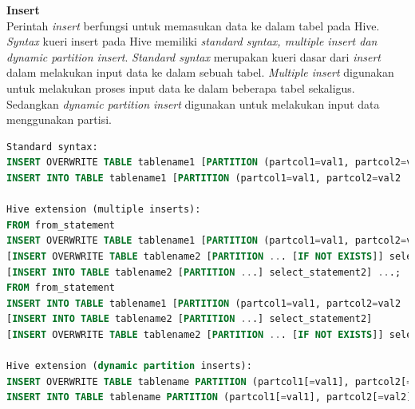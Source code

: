 \textbf{Insert}\\
Perintah \textit{insert} berfungsi untuk memasukan data ke dalam tabel pada Hive. \textit{Syntax} kueri insert pada Hive memiliki \textit{standard syntax, multiple insert dan dynamic partition insert}. \textit{Standard syntax} merupakan kueri dasar dari \textit{insert} dalam melakukan input data ke dalam sebuah tabel. \textit{Multiple insert} digunakan untuk melakukan proses input data ke dalam beberapa tabel sekaligus. Sedangkan \textit{dynamic partition insert} digunakan untuk melakukan input data menggunakan partisi.

\begin{lstlisting}[language=sql,basicstyle=\tiny,caption=Syntax DML Insert]
Standard syntax:
INSERT OVERWRITE TABLE tablename1 [PARTITION (partcol1=val1, partcol2=val2 ...) [IF NOT EXISTS]] select_statement1 FROM from_statement;
INSERT INTO TABLE tablename1 [PARTITION (partcol1=val1, partcol2=val2 ...)] select_statement1 FROM from_statement;
 
Hive extension (multiple inserts):
FROM from_statement
INSERT OVERWRITE TABLE tablename1 [PARTITION (partcol1=val1, partcol2=val2 ...) [IF NOT EXISTS]] select_statement1
[INSERT OVERWRITE TABLE tablename2 [PARTITION ... [IF NOT EXISTS]] select_statement2]
[INSERT INTO TABLE tablename2 [PARTITION ...] select_statement2] ...;
FROM from_statement
INSERT INTO TABLE tablename1 [PARTITION (partcol1=val1, partcol2=val2 ...)] select_statement1
[INSERT INTO TABLE tablename2 [PARTITION ...] select_statement2]
[INSERT OVERWRITE TABLE tablename2 [PARTITION ... [IF NOT EXISTS]] select_statement2] ...;
 
Hive extension (dynamic partition inserts):
INSERT OVERWRITE TABLE tablename PARTITION (partcol1[=val1], partcol2[=val2] ...) select_statement FROM from_statement;
INSERT INTO TABLE tablename PARTITION (partcol1[=val1], partcol2[=val2] ...) select_statement FROM from_statement;
\end{lstlisting}

